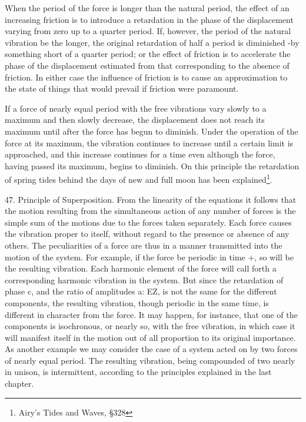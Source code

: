 When the period of the force is longer than the natural period, the effect of
an increasing friction is to introduce a retardation in the phase of the
displacement varying from zero up to a quarter period. If, however, the period
of the natural vibration be the longer, the original retardation of half a
period is diminished -by something short of a quarter period; or the effect of
friction is to accelerate the phase of the displacement estimated from that
corresponding to the absence of friction. In either case the influence of
friction is to cause an approximation to the state of things that would prevail
if friction were paramount.

If a force of nearly equal period with the free vibrations vary slowly to a
maximum and then slowly decrease, the displacement does not reach its maximum
until after the force has begun to diminish. Under the operation of the force
at its maximum, the vibration continues to increase until a certain limit is
approached, and this increase continues for a time even although the force,
having passed its maximum, begins to diminish. On this principle the
retardation of spring tides behind the days of new and full moon has been
explained\footnote{Airy's Tides and Waves, \S 328}.

47. Principle of Superposition.  From the linearity of the equations it follows
that the motion resulting from the simultaneous action of any number of forces
is the simple sum of the motions due to the forces taken separately. Each force
causes the vibration proper to itself, without regard to the presence or
absence of any others. The peculiarities of a force are thus in a manner
transmitted into the motion of the system. For example, if the force be
periodic in time +, so will be the resulting vibration. Each harmonic element
of the force will call forth a corresponding harmonic vibration in the system.
But since the retardation of phase c, and the ratio of amplitudes a: EZ, is not
the same for the different components, the resulting vibration, though periodic
in the same time, is different in character from the force. It may happen, for
instance, that one of the components is isochronous, or nearly so, with the
free vibration, in which case it will manifest itself in the motion out of all
proportion to its original importance. As another example we may consider the
case of a system acted on by two forces of nearly equal period. The resulting
vibration, being compounded of two nearly in unison, is intermittent, according
to the principles explained in the last chapter.

